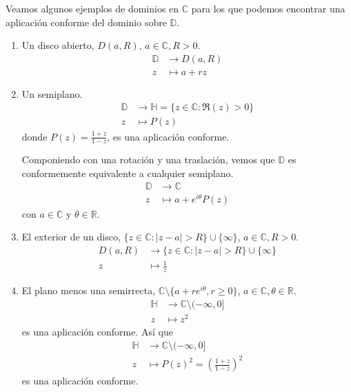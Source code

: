 \begin{example}
    Veamos algunos ejemplos de dominios en $\mathbb{C}$ para los que podemos encontrar una aplicación conforme del dominio sobre $\mathbb{D}$.
    \begin{enumerate}
        \item Un disco abierto, $D(a, R)$, $a \in \mathbb{C}, R > 0$.
              \begin{align*}
                  \mathbb{D} & \to D(a, R)    \\
                  z          & \mapsto a + rz
              \end{align*}
        \item Un semiplano.
              \begin{align*}
                  \mathbb{D} & \to \mathbb{H} = \{z \in \mathbb{C} : \Re(z) > 0\} \\
                  z          & \mapsto P(z)
              \end{align*}
              donde $P(z) = \frac{1+z}{1-z}$, es una aplicación conforme.

              Componiendo con una rotación y una traslación, vemos que $\mathbb{D}$ es conformemente equivalente a cualquier semiplano.
              \begin{align*}
                  \mathbb{D} & \to \mathbb{C}              \\
                  z          & \mapsto a + e^{i\theta}P(z)
              \end{align*}
              con $a \in \mathbb{C}$ y $\theta \in \mathbb{R}$.
        \item El exterior de un disco, $\{z \in \mathbb{C} : |z-a| > R\} \cup \{\infty\}$, $a \in \mathbb{C}, R > 0$.
              \begin{align*}
                  D(a, R) & \to \{z \in \mathbb{C} : |z-a| > R\} \cup \{\infty\} \\
                  z       & \mapsto \frac{1}{z}
              \end{align*}
        \item El plano menos una semirrecta, $\mathbb{C} \setminus \{a + re^{i\theta}, r \geq 0\}$, $a \in \mathbb{C}, \theta \in \mathbb{R}$.
              \begin{align*}
                  \mathbb{H} & \to \mathbb{C} \setminus (-\infty, 0] \\
                  z          & \mapsto z^2
              \end{align*}
              es una aplicación conforme.
              Así que
              \begin{align*}
                  \mathbb{H} & \to \mathbb{C} \setminus (-\infty, 0]           \\
                  z          & \mapsto P(z)^2 = \left(\frac{1+z}{1-z}\right)^2
              \end{align*}
              es una aplicación conforme.


\end{enumerate}
\end{example}
